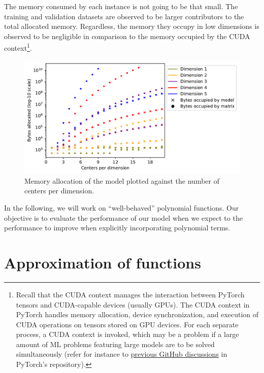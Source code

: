 \documentclass[12pt]{report} %
\begin{document}
The memory consumed by each instance is not going to be that small. The training and validation datasets are observed to be larger contributors to the total allocated memory. Regardless, the memory they occupy in low dimensions is observed to be negligible in comparison to the memory occupied by the CUDA context\footnote{Recall that the CUDA context manages the interaction between PyTorch tensors and CUDA-capable devices (usually GPUs). The CUDA context in PyTorch handles memory allocation, device synchronization, and execution of CUDA operations on tensors stored on GPU devices. For each separate process, a CUDA context is invoked, which may be a problem if a large amount of ML problems featuring large models are to be solved simultaneously  (refer for instance to \href{https://github.com/pytorch/pytorch/issues/20532}{previous GitHub discussions} in PyTorch's repository).}.


\begin{figure}
  \hspace*{-1.5cm}
  \includegraphics[width=1.2\textwidth]{imagenes/model_consumption/Memory_allocation_vs_number_of_centers_per_dimension.pdf}
  \caption{Memory allocation of the model plotted against the number of centers per dimension.}
  \label{fig:model-consumption-memory}
\end{figure}

In the following, we will work on ``well-behaved'' polynomial functions. Our objective is to evaluate the performance of our model when we expect to the performance to improve when explicitly incorporating polynomial terms. %

\section{Approximation of functions}\label{sec:preliminary-problem-1}
\end{document}

